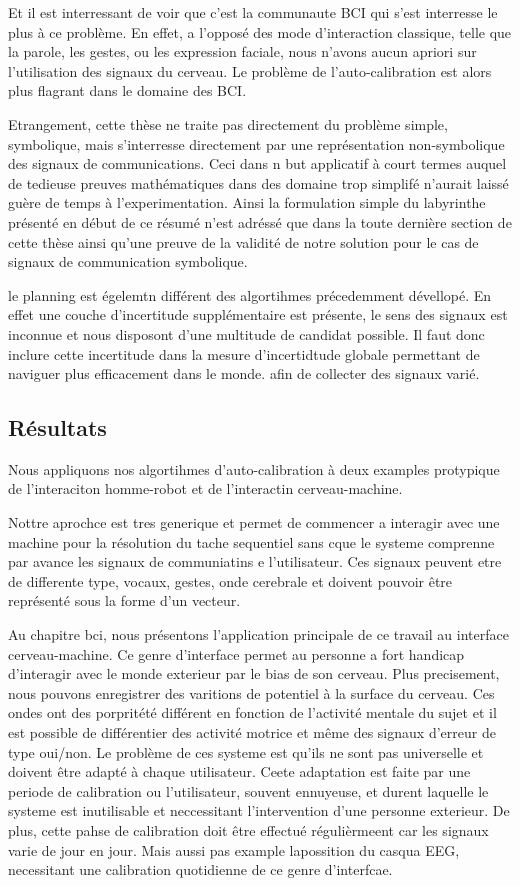 Et il est interressant de voir que c'est la communaute BCI qui s'est interresse le plus à ce problème. En effet, a l'opposé des mode d'interaction classique, telle que la parole, les gestes, ou les expression faciale, nous n'avons aucun apriori sur l'utilisation des signaux du cerveau. Le problème de l'auto-calibration est alors plus flagrant dans le domaine des BCI.

Etrangement, cette thèse ne traite pas directement du problème simple, symbolique, mais s'interresse directement par une représentation non-symbolique des signaux de communications. Ceci dans n but applicatif à court termes auquel de tedieuse preuves mathématiques dans des domaine trop simplifé n'aurait laissé guère de temps à l'experimentation. Ainsi la formulation simple du labyrinthe présenté en début de ce résumé n'est adréssé que dans la toute dernière section de cette thèse ainsi qu'une preuve de la validité de notre solution pour le cas de signaux de communication symbolique.

le planning est égelemtn différent des algortihmes précedemment dévellopé. En effet une couche d'incertitude supplémentaire est présente, le sens des signaux est inconnue et nous disposont d'une multitude de candidat possible. Il faut donc inclure cette incertitude dans la mesure d'incertidtude globale permettant de naviguer plus efficacement dans le monde. afin de collecter des signaux varié.

\subsection*{Résultats}

Nous appliquons nos algortihmes d'auto-calibration à deux examples protypique de l'interaciton homme-robot et de l'interactin cerveau-machine.

Nottre aprochce est tres generique et permet de commencer a interagir avec une machine pour la résolution du tache sequentiel sans cque le systeme comprenne par avance les signaux de communiatins e l'utilisateur. Ces signaux peuvent etre de differente type, vocaux, gestes, onde cerebrale et doivent pouvoir être représenté sous la forme d'un vecteur.

Au chapitre bci, nous présentons l'application principale de ce travail au interface cerveau-machine. Ce genre d'interface permet au personne a fort handicap d'interagir avec le monde exterieur par le bias de son cerveau. Plus precisement, nous pouvons enregistrer des varitions de potentiel à la surface du cerveau. Ces ondes ont des porpritété différent en fonction de l'activité mentale du sujet et il est possible de différentier des activité motrice et même des signaux d'erreur de type oui/non. Le problème de ces systeme est qu'ils ne sont pas universelle et doivent être adapté à chaque utilisateur. Ceete adaptation est faite par une periode de calibration ou l'utilisateur, souvent ennuyeuse, et durent laquelle le systeme est inutilisable et neccessitant l'intervention d'une personne exterieur. De plus, cette pahse de calibration doit être effectué régulièrmeent car les signaux varie de jour en jour. Mais aussi pas example lapossition du casqua EEG, necessitant une calibration quotidienne de ce genre d'interfcae.

